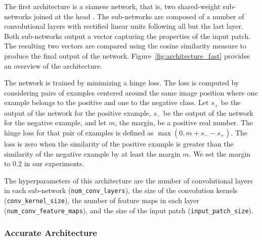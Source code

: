 \documentclass[twoside,11pt]{article}
\begin{document}
The first architecture is a siamese network, that is, two shared-weight
sub-networks joined at the head \citep{bromley1993signature}.  The sub-networks
are composed of a number of convolutional layers with rectified linear units
following all but the last layer. Both sub-networks output a vector capturing
the properties of the input patch. The resulting two vectors are compared using
the cosine similarity measure to produce the final output of the network.
Figure~\ref{fig:architecture_fast} provides an overview of the architecture. 

The network is trained by minimizing a hinge loss. The loss is computed by
considering pairs of examples centered around the same image position where one
example belongs to the positive and one to the negative class. Let \( s_{+}
\) be the output of the network for the positive example, \( s_{-} \) be the
output of the network for the negative example, and let \(m\), the margin, be a
positive real number. The hinge loss for that pair of examples is defined as
$\max(0, m + s_{-} - s_{+})$. The loss is zero when the similarity of the
positive example is greater than the similarity of the negative example by at
least the margin \(m\). We set the margin to 0.2 in our experiments.

The hyperparameters of this architecture are 
the number of convolutional layers in each sub-network (\texttt{num\_conv\_layers}), 
the size of the convolution kernels (\texttt{conv\_kernel\_size}), 
the number of feature maps in each layer (\texttt{num\_conv\_feature\_maps}), 
and the size of the input patch (\texttt{input\_patch\_size}).

\subsubsection{Accurate Architecture}
\end{document}
